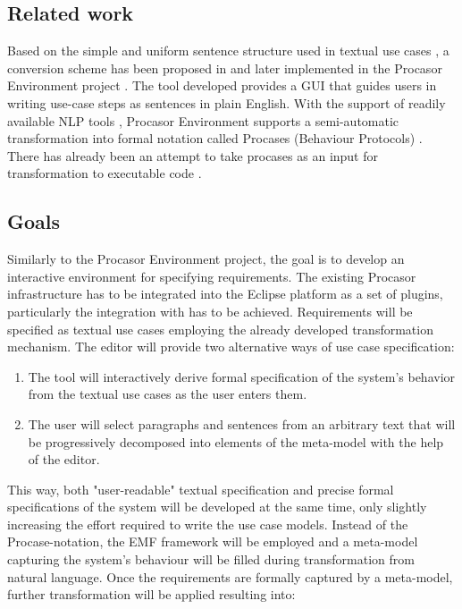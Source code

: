 \documentclass[12pt,a4paper]{article}
\begin{document}
\subsection{Related work}
Based on the simple and uniform sentence structure used in textual use cases \cite{COCKBURN}, a conversion scheme has been proposed in \cite{MENCL}\cite{DRAZAN} and later implemented in the Procasor Environment project \cite{PROCASORENV}.  The tool developed provides a GUI that guides users in writing use-case steps as sentences in plain English.  With the support of readily available NLP tools \cite{COLLINS}\cite{POSTAG}\cite{MORPH}, Procasor Environment supports a semi-automatic transformation into formal notation called Procases (Behaviour Protocols) \cite{BP}.  There has already been an attempt to take procases as an input for transformation to executable code \cite{CODEGEN}.

\subsection{Goals}
Similarly to the Procasor Environment project, the goal is to develop an interactive environment for specifying requirements.  The existing Procasor infrastructure has to be integrated into the Eclipse platform as a set of plugins, particularly the integration with \cite{EMF} has to be achieved.  Requirements will be specified as textual use cases employing the already developed transformation mechanism.  The editor will provide two alternative ways of use case specification:

\begin{enumerate}
\item The tool will interactively derive formal specification of the system's behavior from the textual use cases as the user enters them.
\item The user will select paragraphs and sentences from an arbitrary text that will be progressively decomposed into elements of the meta-model with the help of the editor.
\end{enumerate}
This way, both "user-readable" textual specification and precise formal specifications of the system will be developed at the same time, only slightly increasing the effort required to write the use case models.  Instead of the Procase-notation, the EMF framework will be employed and a meta-model capturing the system's behaviour will be filled during transformation from natural language.  Once the requirements are formally captured by a meta-model, further transformation will be applied resulting into:
\end{document}
